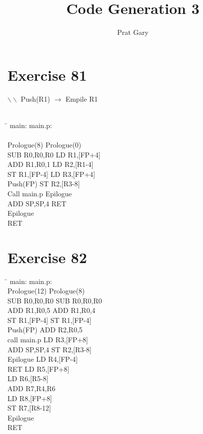 \documentclass[10pt,a4paper]{article}
\author{Prat Gary}
\title{Code Generation 3}
\begin{document}
\maketitle
\section{Exercise 81}
$\backslash\backslash$ Push(R1) $\rightarrow$ Empile R1\\\\
\begin{tabbing}
\hspace{8cm}\=\kill
 main: \> main.p: \\\\
 Prologue(8) \> Prologue(0) \\ 
 SUB R0,R0,R0 \> LD R1,[FP+4] \\ 
 ADD R1,R0,1 \> LD R2,[R1-4]\\
 ST R1,[FP-4] \> LD R3,[FP+4]  \\ 
 Push(FP) \>  ST R2,[R3-8]\\ 
 Call main.p \>   Epilogue\\ 
 ADD SP,SP,4 \>  RET\\ 
 Epilogue \> \\
 RET \> \\
\end{tabbing}
\section{Exercise 82}
\begin{tabbing}
\hspace{8cm}\=\kill
main:\> main.p:\\
Prologue(12) \> Prologue(8)\\
SUB R0,R0,R0 \> SUB R0,R0,R0\\
ADD R1,R0,5 \> ADD R1,R0,4\\
ST R1,[FP-4] \> ST R1,[FP-4]\\
Push(FP) \> ADD R2,R0,5\\
call main.p \> LD R3,[FP+8]\\
ADD SP,SP,4 \> ST R2,[R3-8]\\
Epilogue \> LD R4,[FP-4]\\
RET \> LD R5,[FP+8] \\
\> LD R6,[R5-8]\\
\> ADD R7,R4,R6\\
\> LD R8,[FP+8]\\
\> ST R7,[R8-12]\\
\> Epilogue\\
\> RET\\
\end{tabbing}
\end{document}

